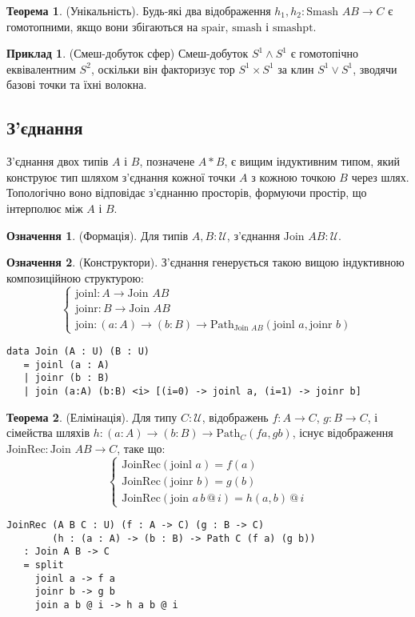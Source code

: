 \documentclass{article}
\theoremstyle{definition}
\newtheorem{theorem}{Теорема}
\newtheorem{definition}{Означення}
\newtheorem{example}{Приклад}
\begin{document}
\begin{theorem} (Унікальність).
Будь-які два відображення \( h_1, h_2 : \text{Smash } A B \to C \) є гомотопними,
якщо вони збігаються на \( \text{spair} \), \( \text{smash} \) і \( \text{smashpt} \).
\end{theorem}

\begin{example} (Смеш-добуток сфер)
Смеш-добуток \( S^1 \wedge S^1 \) є гомотопічно еквівалентним \( S^2 \),
оскільки він факторизує тор \( S^1 \times S^1 \) за клин \( S^1 \vee S^1 \),
зводячи базові точки та їхні волокна.
\end{example}

\newpage
\subsection{З’єднання}
З’єднання двох типів \( A \) і \( B \), позначене \( A * B \),
є вищим індуктивним типом, який конструює тип шляхом
з’єднання кожної точки \( A \) з кожною точкою \( B \) через шлях.
Топологічно воно відповідає з’єднанню просторів, формуючи
простір, що інтерполює між \( A \) і \( B \).

\begin{definition} (Формація).
Для типів \( A, B : \mathcal{U} \), з’єднання \( \text{Join } A B : \mathcal{U} \).
\end{definition}

\begin{definition} (Конструктори).
З’єднання генерується такою вищою індуктивною композиційною структурою:
\[
\begin{cases}
\text{joinl} : A \to \text{Join } A B \\
\text{joinr} : B \to \text{Join } A B \\
\text{join} : (a : A) \to (b : B) \to \text{Path}_{\text{Join } A B} (\text{joinl } a, \text{joinr } b)
\end{cases}
\]
\begin{lstlisting}
data Join (A : U) (B : U)
   = joinl (a : A)
   | joinr (b : B)
   | join (a:A) (b:B) <i> [(i=0) -> joinl a, (i=1) -> joinr b]
\end{lstlisting}
\end{definition}

\begin{theorem} (Елімінація).
Для типу \( C : \mathcal{U} \), відображень \( f : A \to C \), \( g : B \to C \),
і сімейства шляхів \( h : (a : A) \to (b : B) \to \text{Path}_C (f a, g b) \),
існує відображення \( \text{JoinRec} : \text{Join } A B \to C \), таке що:
\[
\begin{cases}
\text{JoinRec}(\text{joinl } a) = f(a) \\
\text{JoinRec}(\text{joinr } b) = g(b) \\
\text{JoinRec}(\text{join } a \, b \, @ \, i) = h(a, b) \, @ \, i
\end{cases}
\]
\begin{lstlisting}
JoinRec (A B C : U) (f : A -> C) (g : B -> C)
        (h : (a : A) -> (b : B) -> Path C (f a) (g b))
   : Join A B -> C
   = split
     joinl a -> f a
     joinr b -> g b
     join a b @ i -> h a b @ i
\end{lstlisting}
\end{theorem}
\end{document}
